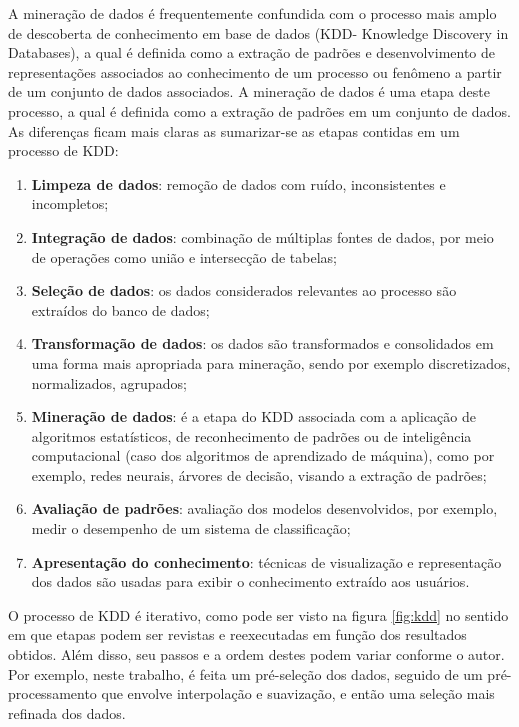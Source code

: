 A mineração de dados é frequentemente confundida com o processo mais amplo de descoberta de conhecimento em base de dados (KDD- Knowledge Discovery in Databases), a qual é definida como a extração de padrões e desenvolvimento de representações associados ao conhecimento de um processo ou fenômeno a partir de um conjunto de dados associados. A mineração de dados é uma etapa deste processo, a qual é definida como a extração de padrões em um conjunto de dados. As diferenças ficam mais claras as sumarizar-se as etapas contidas em um processo de KDD:

\begin{enumerate}
\item {\bf Limpeza de dados}: remoção de dados com ruído, inconsistentes e incompletos;
\item {\bf Integração de dados}: combinação de múltiplas fontes de dados, por meio de operações como união e intersecção de tabelas;
\item {\bf Seleção de dados}: os dados considerados relevantes ao processo são extraídos do banco de dados;
\item {\bf Transformação de dados}: os dados são transformados e consolidados em uma forma mais apropriada para mineração, sendo por exemplo discretizados, normalizados, agrupados;
\item {\bf Mineração de dados}: é a etapa do KDD associada com a aplicação de algoritmos estatísticos, de reconhecimento de padrões ou de inteligência computacional (caso dos algoritmos de aprendizado de máquina), como por exemplo, redes neurais, árvores de decisão, visando a extração de padrões;
\item {\bf Avaliação de padrões}: avaliação dos modelos desenvolvidos, por exemplo, medir o desempenho de um sistema de classificação;
\item {\bf Apresentação do conhecimento}: técnicas de visualização e representação dos dados são usadas para exibir o conhecimento extraído aos usuários.
\end{enumerate} 

O processo de KDD é iterativo, como pode ser visto na figura \ref{fig:kdd} no sentido em que etapas podem ser revistas e reexecutadas em função dos resultados obtidos. Além disso, seu passos e a ordem destes podem variar conforme o autor. Por exemplo, neste trabalho, é feita um pré-seleção dos dados, seguido de um pré-processamento que envolve interpolação e suavização, e então uma seleção mais refinada dos dados.

